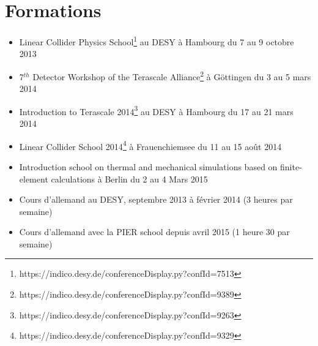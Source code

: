 \documentclass[a4papper, 10pt]{article}
\begin{document}
  \section*{Formations}
 
  \begin{itemize}
    \item Linear Collider Physics School\footnote{https://indico.desy.de/conferenceDisplay.py?confId=7513} au DESY à Hambourg du 7 au 9 octobre 2013
    \item 7$^{th}$ Detector Workshop of the Terascale Alliance\footnote{https://indico.desy.de/conferenceDisplay.py?confId=9389} à Göttingen du 3 au 5 mars 2014
    \item Introduction to Terascale 2014\footnote{https://indico.desy.de/conferenceDisplay.py?confId=9263} au DESY à Hambourg du 17 au 21 mars 2014
    \item Linear Collider School 2014\footnote{https://indico.desy.de/conferenceDisplay.py?confId=9329} à Frauenchiemsee du 11 au 15 août 2014
    \item Introduction school on thermal and mechanical simulations based on finite-element calculations à Berlin du 2 au 4 Mars 2015
    \item Cours d'allemand au DESY, septembre 2013 à février 2014 (3 heures par semaine)
    \item Cours d'allemand avec la PIER school depuis avril 2015 (1 heure 30 par semaine)
  \end{itemize}

 
\end{document}
